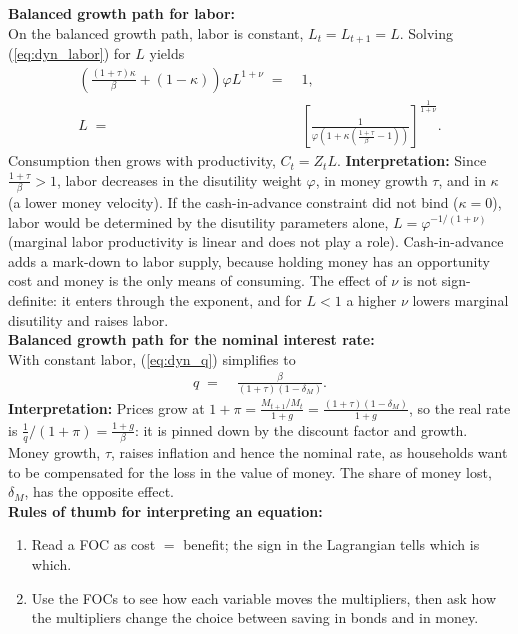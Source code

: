 \documentclass[a4paper, 12pt]{article}
\begin{document}
\begin{Answer}
\begin{itemize}
	\end{itemize}%
	\textbf{Balanced growth path for labor:}\\%
	On the balanced growth path, labor is constant, $L_t = L_{t+1} = L$. Solving (\ref{eq:dyn_labor}) for $L$ yields%
	\begin{align}%
		\left(\frac{(1+\tau)\kappa}{\beta}+(1-\kappa)\right) \varphi L^{1+\nu} \; = & \; 1,\\%
		L \; = & \; \left[\frac{1}{\varphi \left(1 + \kappa \left( \frac{1+\tau}{\beta} - 1 \right) \right)}\right]^{\frac{1}{1+\nu}}.\label{eq:labor_bgp}%
	\end{align}%
	Consumption then grows with productivity, $C_t = Z_tL$. \textbf{Interpretation:} Since $\frac{1+\tau}{\beta}>1$, labor decreases in the disutility weight $\varphi$, in money growth $\tau$, and in $\kappa$ (a lower money velocity). If the cash-in-advance constraint did not bind ($\kappa = 0$), labor would be determined by the disutility parameters alone, $L = \varphi^{-1/(1+\nu)}$ (marginal labor productivity is linear and does not play a role). Cash-in-advance adds a mark-down to labor supply, because holding money has an opportunity cost and money is the only means of consuming. The effect of $\nu$ is not sign-definite: it enters through the exponent, and for $L<1$ a higher $\nu$ lowers marginal disutility and raises labor.%
	\medskip\\%
	\textbf{Balanced growth path for the nominal interest rate:}\\%
	With constant labor, (\ref{eq:dyn_q}) simplifies to%
	\begin{align}%
		q \; = & \; \frac{\beta}{\left(1+\tau\right)\left(1-\delta_M\right)}.%
	\end{align}%
	\textbf{Interpretation:} Prices grow at $1+\pi = \frac{M_{t+1}/M_t}{1+g} = \frac{(1+\tau)(1-\delta_M)}{1+g}$, so the real rate is $\frac{1}{q}/(1+\pi) = \frac{1+g}{\beta}$: it is pinned down by the discount factor and growth. Money growth, $\tau$, raises inflation and hence the nominal rate, as households want to be compensated for the loss in the value of money. The share of money lost, $\delta_M$, has the opposite effect.%
	\medskip\\%
	\textbf{Rules of thumb for interpreting an equation:}%
	\begin{enumerate}%
		\item Read a FOC as cost $=$ benefit; the sign in the Lagrangian tells which is which.
		\item Use the FOCs to see how each variable moves the multipliers, then ask how the multipliers change the choice between saving in bonds and in money.

\end{enumerate}
\end{Answer}
\end{document}
